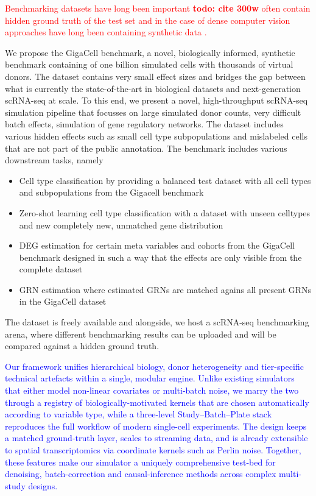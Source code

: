 \documentclass{article}
\newcommand{\phflo}[1]{\textcolor{red}{#1}}
\newcommand{\gpt}[1]{\textcolor{blue}{#1}}
\begin{document}
\phflo{
Benchmarking datasets have long been important \textbf{todo: cite 300w} often contain hidden ground truth of the test set \cite{baker2011database, butler2012naturalistic} and in the case of dense computer vision approaches have long been containing synthetic data \cite{baker2011database, butler2012naturalistic}. }

We propose the GigaCell benchmark, a novel, biologically informed, synthetic benchmark containing of one billion simulated cells with thousands of virtual donors. The dataset contains very small effect sizes and bridges the gap between what is currently the state-of-the-art in biological datasets and next-generation scRNA-seq at scale. 
To this end, we present a novel, high-throughput scRNA-seq simulation pipeline that focusses on large simulated donor counts, very difficult batch effects, simulation of gene regulatory networks. The dataset includes various hidden effects such as small cell type subpopulations and mislabeled cells that are not part of the public annotation. The benchmark includes various downstream tasks, namely
\begin{itemize}
	\item Cell type classification by providing a balanced test dataset with all cell types and subpopulations from the Gigacell benchmark
	\item Zero-shot learning cell type classification with a dataset with unseen celltypes and new completely new, unmatched gene distribution
	\item DEG estimation for certain meta variables and cohorts from the GigaCell benchmark designed in such a way that the effects are only visible from the complete dataset
	\item GRN estimation where estimated GRNs are matched agains all present GRNs in the GigaCell dataset
\end{itemize}
The dataset is freely available and alongside, we host a scRNA-seq benchmarking arena, where different benchmarking results can be uploaded and will be compared against a hidden ground truth.

\gpt{Our framework unifies hierarchical biology, donor heterogeneity and tier-specific technical artefacts within a single, modular engine. Unlike existing simulators that either model non-linear covariates or multi-batch noise, we marry the two through a registry of biologically-motivated kernels that are chosen automatically according to variable type, while a three-level Study–Batch–Plate stack reproduces the full workflow of modern single-cell experiments. The design keeps a matched ground-truth layer, scales to streaming data, and is already extensible to spatial transcriptomics via coordinate kernels such as Perlin noise. Together, these features make our simulator a uniquely comprehensive test-bed for denoising, batch-correction and causal-inference methods across complex multi-study designs.}
\end{document}
